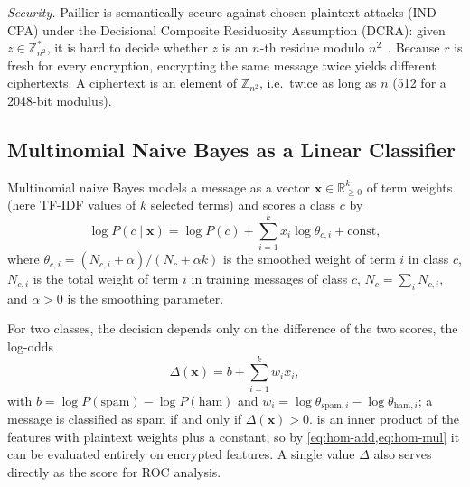 \textit{Security.}
Paillier is semantically secure against chosen-plaintext attacks (IND-CPA) under the Decisional Composite Residuosity Assumption (DCRA): given $z \in \mathbb{Z}_{n^2}^*$, it is hard to decide whether $z$ is an $n$-th residue modulo $n^2$~\cite{paillier1999}.
Because $r$ is fresh for every encryption, encrypting the same message twice yields different ciphertexts.
A ciphertext is an element of $\mathbb{Z}_{n^2}$, i.e.\ twice as long as $n$ (\SI{512}{\byte} for a \num{2048}-bit modulus).

\subsection{Multinomial Naive Bayes as a Linear Classifier}

Multinomial naive Bayes models a message as a vector $\mathbf{x} \in \mathbb{R}_{\ge 0}^{k}$ of term weights (here TF-IDF values of $k$ selected terms) and scores a class $c$ by
\begin{equation}
  \log P(c \mid \mathbf{x}) = \log P(c) + \sum_{i=1}^{k} x_i \log \theta_{c,i} + \text{const},
\end{equation}
where $\theta_{c,i} = (N_{c,i} + \alpha) / (N_c + \alpha k)$ is the smoothed weight of term $i$ in class $c$, $N_{c,i}$ is the total weight of term $i$ in training messages of class $c$, $N_c = \sum_i N_{c,i}$, and $\alpha > 0$ is the smoothing parameter.

For two classes, the decision depends only on the difference of the two scores, the log-odds
\begin{equation}
  \Delta(\mathbf{x}) = b + \sum_{i=1}^{k} w_i x_i, \label{eq:log-odds}
\end{equation}
with $b = \log P(\text{spam}) - \log P(\text{ham})$ and $w_i = \log \theta_{\text{spam},i} - \log \theta_{\text{ham},i}$; a message is classified as spam if and only if $\Delta(\mathbf{x}) > 0$.
 is an inner product of the features with plaintext weights plus a constant, so by \cref{eq:hom-add,eq:hom-mul} it can be evaluated entirely on encrypted features.
A single value $\Delta$ also serves directly as the score for ROC analysis.
